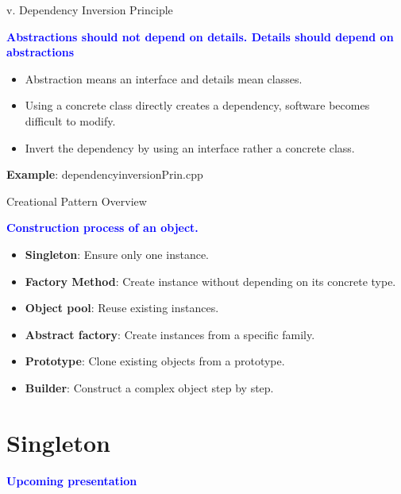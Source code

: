 \documentclass[13pt]{beamer}
\begin{document}
\begin{frame}{v. Dependency Inversion Principle}
	\begin{center}
		\textcolor{blue}{\textbf{Abstractions should not depend on details. Details should 				depend on abstractions}}
	\end{center}
	
	\begin{itemize}
		\setlength\itemsep{1em}
		\item Abstraction means an interface and details mean classes.
		\item Using a concrete class directly creates a dependency, software becomes difficult 			to modify.
		\item Invert the dependency by using an interface rather a concrete class.
	\end{itemize}
	\textbf{Example}: dependencyinversionPrin.cpp
\end{frame}

\begin{frame}{Creational Pattern Overview}
	\begin{center}
		\textcolor{blue}{\textbf{Construction process of an object.}}
	\end{center}
	
	\begin{itemize}
		\setlength\itemsep{1em}
		\item \textbf{Singleton}: Ensure only one instance.
		\item \textbf{Factory Method}: Create instance without depending on its concrete type.
		\item \textbf{Object pool}: Reuse existing instances.
		\item \textbf{Abstract factory}: Create instances from a specific family.
		\item \textbf{Prototype}: Clone existing objects from a prototype.
		\item \textbf{Builder}: Construct a complex object step by step.
	\end{itemize}
\end{frame}

\section{Singleton}
\begin{frame}
\begin{center}
\textcolor{blue}{\textbf{Upcoming presentation}}
\end{center}
\end{frame}
\end{document}
